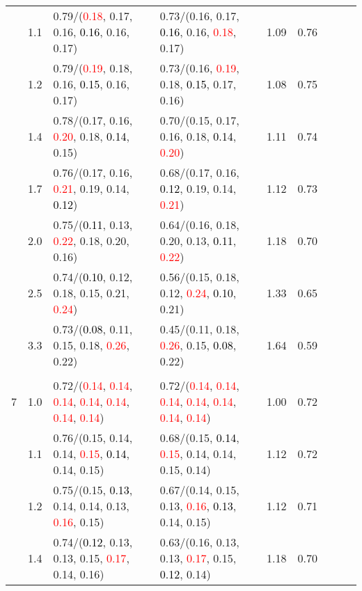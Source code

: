 \documentclass[10pt,a4paper]{report}
\begin{document}
\begin{table}[!htbp]
\begin{center}
{\begin{tabular}{ccllccccc}
			&1.1&0.79/(\textcolor{red}{0.18}, 0.17, 0.16, \textcolor{black}{0.16}, 0.16, 0.17)&0.73/(0.16, 0.17, \textcolor{black}{0.16}, 0.16, \textcolor{red}{0.18}, 0.17)&1.09&0.76\\
			&1.2&0.79/(\textcolor{red}{0.19}, 0.18, 0.16, \textcolor{black}{0.15}, 0.16, 0.17)&0.73/(0.16, \textcolor{red}{0.19}, 0.18, \textcolor{black}{0.15}, 0.17, 0.16)&1.08&0.75\\
			&1.4&0.78/(0.17, 0.16, \textcolor{red}{0.20}, 0.18, \textcolor{black}{0.14}, 0.15)&0.70/(0.15, 0.17, 0.16, 0.18, \textcolor{black}{0.14}, \textcolor{red}{0.20})&1.11&0.74\\
			&1.7&0.76/(0.17, 0.16, \textcolor{red}{0.21}, 0.19, 0.14, \textcolor{black}{0.12})&0.68/(0.17, 0.16, \textcolor{black}{0.12}, 0.19, 0.14, \textcolor{red}{0.21})&1.12&0.73\\
			&2.0&0.75/(\textcolor{black}{0.11}, 0.13, \textcolor{red}{0.22}, 0.18, 0.20, 0.16)&0.64/(0.16, 0.18, 0.20, 0.13, \textcolor{black}{0.11}, \textcolor{red}{0.22})&1.18&0.70\\
			&2.5&0.74/(\textcolor{black}{0.10}, 0.12, 0.18, 0.15, 0.21, \textcolor{red}{0.24})&0.56/(0.15, 0.18, 0.12, \textcolor{red}{0.24}, \textcolor{black}{0.10}, 0.21)&1.33&0.65\\
			&3.3&0.73/(\textcolor{black}{0.08}, 0.11, 0.15, 0.18, \textcolor{red}{0.26}, 0.22)&0.45/(0.11, 0.18, \textcolor{red}{0.26}, 0.15, \textcolor{black}{0.08}, 0.22)&1.64&0.59\\
			&&&&\\
			7			&1.0&0.72/(\textcolor{red}{0.14}, \textcolor{red}{0.14}, \textcolor{red}{0.14}, \textcolor{red}{0.14}, \textcolor{red}{0.14}, \textcolor{red}{0.14}, \textcolor{red}{0.14})&0.72/(\textcolor{red}{0.14}, \textcolor{red}{0.14}, \textcolor{red}{0.14}, \textcolor{red}{0.14}, \textcolor{red}{0.14}, \textcolor{red}{0.14}, \textcolor{red}{0.14})&1.00&0.72\\
			&1.1&0.76/(0.15, 0.14, 0.14, \textcolor{red}{0.15}, \textcolor{black}{0.14}, 0.14, 0.15)&0.68/(0.15, \textcolor{black}{0.14}, \textcolor{red}{0.15}, 0.14, 0.14, 0.15, 0.14)&1.12&0.72\\
			&1.2&0.75/(0.15, \textcolor{black}{0.13}, 0.14, 0.14, 0.13, \textcolor{red}{0.16}, 0.15)&0.67/(0.14, 0.15, 0.13, \textcolor{red}{0.16}, \textcolor{black}{0.13}, 0.14, 0.15)&1.12&0.71\\
			&1.4&0.74/(\textcolor{black}{0.12}, 0.13, 0.13, 0.15, \textcolor{red}{0.17}, 0.14, 0.16)&0.63/(0.16, 0.13, 0.13, \textcolor{red}{0.17}, 0.15, \textcolor{black}{0.12}, 0.14)&1.18&0.70\\

\end{tabular}}
\end{center}
\end{table}
\end{document}
